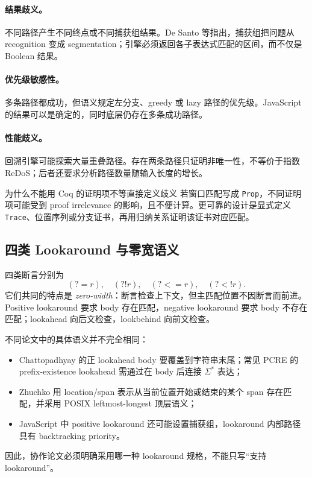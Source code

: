 \documentclass[UTF8,a4paper,12pt]{ctexart}
\begin{document}
\paragraph{结果歧义。}
不同路径产生不同终点或不同捕获组结果。De Santo 等指出，捕获组把问题从 recognition 变成 segmentation；引擎必须返回各子表达式匹配的区间，而不仅是 Boolean 结果\cite[p.~2]{desanto2024}。

\paragraph{优先级敏感性。}
多条路径都成功，但语义规定左分支、greedy 或 lazy 路径的优先级。JavaScript 的结果可以是确定的，同时底层仍存在多条成功路径。

\paragraph{性能歧义。}
回溯引擎可能探索大量重叠路径。存在两条路径只证明非唯一性，不等价于指数 ReDoS；后者还要求分析路径数量随输入长度的增长。

\begin{conceptbox}{为什么不能用 Coq 的证明项不等直接定义歧义}
若窗口匹配写成 \texttt{Prop}，不同证明项可能受到 proof irrelevance 的影响，且不便计算。更可靠的设计是显式定义 \texttt{Trace}、位置序列或分支证书，再用归纳关系证明该证书对应匹配。
\end{conceptbox}

\subsection{四类 Lookaround 与零宽语义}

四类断言分别为
\[
(?=r),\quad(?!r),\quad(?<=r),\quad(?<!r).
\]
它们共同的特点是 \emph{zero-width}：断言检查上下文，但主匹配位置不因断言而前进。Positive lookaround 要求 body 存在匹配，negative lookaround 要求 body 不存在匹配；lookahead 向后文检查，lookbehind 向前文检查。

不同论文中的具体语义并不完全相同：
\begin{itemize}
  \item Chattopadhyay 的正 lookahead body 要覆盖到字符串末尾；常见 PCRE 的 prefix-existence lookahead 需通过在 body 后连接 $\Sigma^*$ 表达\cite[p.~3]{chattopadhyay2025}；
  \item Zhuchko 用 location/span 表示从当前位置开始或结束的某个 span 存在匹配，并采用 POSIX leftmost-longest 顶层语义\cite[pp.~4--10]{zhuchko2024}；
  \item JavaScript 中 positive lookaround 还可能设置捕获组，lookaround 内部路径具有 backtracking priority\cite[pp.~4--8]{barriere2026}。
\end{itemize}
因此，协作论文必须明确采用哪一种 lookaround 规格，不能只写“支持 lookaround”。
\end{document}
